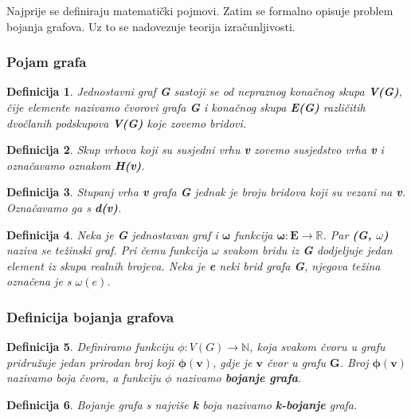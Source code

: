 \documentclass[times, utf8, diplomski, numeric]{fer}
\newtheorem{definition}{Definicija}
\begin{document}
Najprije se definiraju matematički pojmovi. Zatim se formalno opisuje problem bojanja grafova. Uz to se nadovezuje teorija izračunljivosti.

\subsubsection{Pojam grafa}

\begin{definition}
Jednostavni graf \textbf{G} sastoji se od nepraznog konačnog skupa \textbf{V(G)}, čije elemente nazivamo čvorovi grafa \textbf{G} i konačnog skupa \textbf{E(G)} različitih dvočlanih podskupova \textbf{V(G)} koje zovemo bridovi.
\end{definition}

\begin{definition}
Skup vrhova koji su susjedni vrhu \textbf{v} zovemo susjedstvo vrha \textbf{v} i označavamo oznakom \textbf{H(v)}.
\end{definition}

\begin{definition}
Stupanj vrha \textbf{v} grafa \textbf{G} jednak je broju bridova koji su vezani na \textbf{v}. Označavamo ga s \textbf{d(v)}.
\end{definition}

\begin{definition}
Neka je \textbf{G} jednostavan graf i $\mathbf{\omega}$ funkcija $\mathbf{\omega : E \rightarrow \mathbb{R}}$. Par \textbf{(G, $\omega$)} naziva se težinski graf. Pri čemu funkcija $\omega$ svakom bridu iz \textbf{G} dodjeljuje jedan element iz skupa realnih brojeva. Neka je \textbf{e} neki brid grafa \textbf{G}, njegova težina označena je s $\omega(\mathbf{\mathit{e}})$.	 
\end{definition}


\subsubsection{Definicija bojanja grafova}

\begin{definition}
Definiramo funkciju $\phi : V(G) \rightarrow \mathbb{N}$, koja svakom čvoru u grafu pridružuje jedan prirodan broj koji $\mathbf{\phi(v)}$, gdje je $\mathbf{v}$ čvor u grafu $\mathbf{G}$. Broj $\mathbf{\phi(v)}$ nazivamo boja čvora, a funkciju $\phi$ nazivamo \textbf{bojanje grafa}. 
\end{definition}

\begin{definition}
Bojanje grafa s najviše \textbf{k} boja nazivamo \textbf{k-bojanje} grafa. 
\end{definition}
\end{document}
